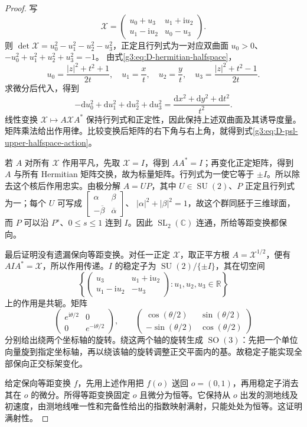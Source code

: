 \begin{proof}
	写
	\[
		\mathcal X=
		\begin{pmatrix}u_0+u_3&u_1+\mathrm iu_2\\
		                u_1-\mathrm iu_2&u_0-u_3\end{pmatrix}.
	\]
	则 \(\det\mathcal X=u_0^2-u_1^2-u_2^2-u_3^2\)，正定且行列式为一对应双曲面
	\(u_0>0\)、\(-u_0^2+u_1^2+u_2^2+u_3^2=-1\)。
	由式\eqref{g3:eq:D-hermitian-halfspace}，
	\[
		u_0=\frac{|z|^2+t^2+1}{2t},\quad
		u_1=\frac{x}{t},\quad u_2=\frac{y}{t},\quad
		u_3=\frac{|z|^2+t^2-1}{2t}.
	\]
	求微分后代入，得到
	\[
		-\mathrm du_0^2+\mathrm du_1^2+\mathrm du_2^2+\mathrm du_3^2
		=\frac{\mathrm dx^2+\mathrm dy^2+\mathrm dt^2}{t^2}.
	\]
	线性变换 \(\mathcal X\mapsto A\mathcal XA^*\) 保持行列式和正定性，因此保持上述双曲面及其诱导度量。矩阵乘法给出作用律。比较变换后矩阵的右下角与右上角，就得到式\eqref{g3:eq:D-psl-upper-halfspace-action}。

	若 \(A\) 对所有 \(\mathcal X\) 作用平凡，先取 \(\mathcal X=I\)，得到 \(AA^*=I\)；再变化正定矩阵，得到 \(A\) 与所有 Hermitian 矩阵交换，故为标量矩阵。行列式为一使它等于 \(\pm I\)。所以除去这个核后作用忠实。由极分解 \(A=UP\)，其中 \(U\in\operatorname{SU}(2)\)、\(P\) 正定且行列式为一；每个 \(U\) 可写成
	\(\left[\begin{smallmatrix}\alpha&\beta\\-\overline\beta&\overline\alpha\end{smallmatrix}\right]\)、
	\(|\alpha|^2+|\beta|^2=1\)，故这个群同胚于三维球面，而 \(P\) 可以沿 \(P^s\)、\(0\le s\le1\) 连到 \(I\)。因此 \(\operatorname{SL}_2(\mathbb C)\) 连通，所给等距变换都保向。

	最后证明没有遗漏保向等距变换。对任一正定 \(\mathcal X\)，取正平方根 \(A=\mathcal X^{1/2}\)，便有 \(AIA^*=\mathcal X\)，所以作用传递。\(I\) 的稳定子为 \(\operatorname{SU}(2)/\{\pm I\}\)，其在切空间
	\[
		\left\{\begin{pmatrix}u_3&u_1+\mathrm iu_2\\
		 u_1-\mathrm iu_2&-u_3\end{pmatrix}:u_1,u_2,u_3\in\mathbb R\right\}
	\]
	上的作用是共轭。矩阵
	\[
		\begin{pmatrix}e^{\mathrm i\theta/2}&0\\0&e^{-\mathrm i\theta/2}\end{pmatrix},
		\qquad
		\begin{pmatrix}\cos(\theta/2)&\sin(\theta/2)\\
		-\sin(\theta/2)&\cos(\theta/2)\end{pmatrix}
	\]
	分别给出绕两个坐标轴的旋转。绕这两个轴的旋转生成
	\(\operatorname{SO}(3)\)：先把一个单位向量旋到指定坐标轴，再以绕该轴的旋转调整正交平面内的基。故稳定子能实现全部保向正交标架变化。

	给定保向等距变换 \(f\)，先用上述作用把 \(f(o)\) 送回 \(o=(0,1)\)，再用稳定子消去其在 \(o\) 的微分。所得等距变换固定 \(o\) 且微分为恒等。它保持从 \(o\) 出发的测地线及初速度，由测地线唯一性和完备性给出的指数映射满射，只能处处为恒等。这证明满射性。
\end{proof}

